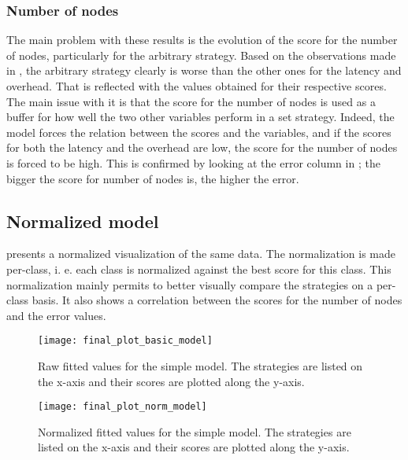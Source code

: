 \subsubsection{Number of nodes}
\label{ssec:nbNodes}
The main problem with these results is the evolution of the score for the number
of nodes, particularly for the arbitrary strategy. Based on the observations
made in , the arbitrary strategy clearly is worse than the
other ones for the latency and overhead. That is reflected with the values
obtained for their respective scores. The main issue with it is that the score
for the number of nodes is used as a buffer for how well the two other variables
perform in a set strategy. Indeed, the model forces the relation between the
scores and the variables, and if the scores for both the latency and the
overhead are low, the score for the number of nodes is forced to be high. This
is confirmed by looking at the error column in ; the bigger
the score for number of nodes is, the higher the error.

\subsection{Normalized model}

 presents a normalized visualization of the same
data. The normalization is made per-class, i. e. each class is normalized
against the best score for this class. This normalization mainly permits to
better visually compare the strategies on a per-class basis. It also shows a
correlation between the scores for the number of nodes and the error values.

\begin{figure}[h]
    \centering
    \texttt{[image: final\_plot\_basic\_model]}
    \captionsetup{justification=centering}
    \caption{Raw fitted values for the simple model. The strategies are listed
    on the x-axis and their scores are plotted along the y-axis. }
    \label{fig:recapTestsPlot}
\end{figure}

\begin{figure}[h]
    \centering
    \texttt{[image: final\_plot\_norm\_model]}
    \captionsetup{justification=centering}
    \caption{Normalized fitted values for the simple model. The strategies are listed
    on the x-axis and their scores are plotted along the y-axis. }
    \label{fig:recapTestsPlotNorm}
\end{figure}


